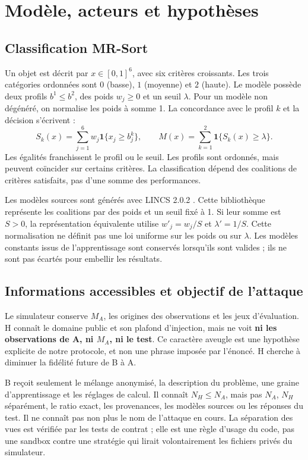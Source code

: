 \documentclass[11pt,a4paper]{article}
\newcommand{\ind}{\mathbf{1}}
\begin{document}
\section{Modèle, acteurs et hypothèses}
\subsection{Classification MR-Sort}

Un objet est décrit par $x\in[0,1]^6$, avec six critères croissants. Les trois
catégories ordonnées sont $0$ (basse), $1$ (moyenne) et $2$ (haute). Le modèle
possède deux profils $b^1\leq b^2$, des poids $w_j\geq0$ et un seuil $\lambda$.
Pour un modèle non dégénéré, on normalise les poids à somme 1. La concordance
avec le profil $k$ et la décision s'écrivent :
\begin{equation}
 S_k(x)=\sum_{j=1}^{6}w_j\ind\{x_j\geq b_j^k\},\qquad
 M(x)=\sum_{k=1}^{2}\ind\{S_k(x)\geq\lambda\}.
 \label{eq:mrsort}
\end{equation}
Les égalités franchissent le profil ou le seuil. Les profils sont ordonnés,
mais peuvent coïncider sur certains critères. La classification dépend des
coalitions de critères satisfaits, pas d'une somme des performances.

Les modèles sources sont générés avec LINCS 2.0.2 \cite{lincs}. Cette bibliothèque
représente les coalitions par des poids et un seuil fixé à 1. Si leur somme
est $S>0$, la représentation équivalente utilise $w'_j=w_j/S$ et $\lambda'=1/S$.
Cette normalisation ne définit pas une loi uniforme sur les poids ou sur
$\lambda$. Les modèles constants issus de l'apprentissage sont conservés
lorsqu'ils sont valides ; ils ne sont pas écartés pour embellir les résultats.

\subsection{Informations accessibles et objectif de l'attaque}

Le simulateur conserve $M_A$, les origines des observations et les jeux
d'évaluation. H connaît le domaine public et son plafond d'injection, mais ne
voit \textbf{ni les observations de A, ni $M_A$, ni le test}. Ce caractère aveugle
est une hypothèse explicite de notre protocole, et non une phrase imposée par
l'énoncé. H cherche à diminuer la fidélité future de B à A.

B reçoit seulement le mélange anonymisé, la description du problème, une
graine d'apprentissage et les réglages de calcul. Il connaît $N_H\leq N_A$,
mais pas $N_A$, $N_H$ séparément, le ratio exact, les provenances, les modèles
sources ou les réponses du test. Il ne connaît pas non plus le nom de l'attaque
en cours. La séparation des vues est vérifiée par les tests de contrat ; elle
est une règle d'usage du code, pas une sandbox contre une stratégie qui lirait
volontairement les fichiers privés du simulateur.
\end{document}
